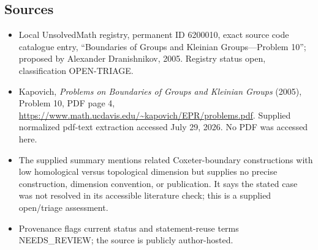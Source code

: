 \documentclass[11pt]{article}
\begin{document}
\subsection{Sources}
\begin{itemize}
\item Local UnsolvedMath registry, permanent ID 6200010, exact source code catalogue entry, ``Boundaries of Groups and Kleinian Groups---Problem 10''; proposed by Alexander Dranishnikov, 2005. Registry status open, classification OPEN-TRIAGE.
\item Kapovich, \emph{Problems on Boundaries of Groups and Kleinian Groups} (2005), Problem 10, PDF page 4, \url{https://www.math.ucdavis.edu/~kapovich/EPR/problems.pdf}. Supplied normalized pdf-text extraction accessed July 29, 2026. No PDF was accessed here.
\item The supplied summary mentions related Coxeter-boundary constructions with low homological versus topological dimension but supplies no precise construction, dimension convention, or publication. It says the stated case was not resolved in its accessible literature check; this is a supplied open/triage assessment.
\item Provenance flags current status and statement-reuse terms NEEDS\_REVIEW; the source is publicly author-hosted.
\end{itemize}
\end{document}
